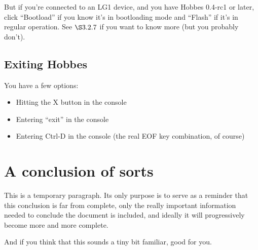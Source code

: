But if you're connected to an LG1 device, and you have Hobbes 0.4-rc1 or later, click ``Bootload'' if you know it's in bootloading mode and ``Flash'' if it's in regular operation. See \hyperref[3.2.7]{$\S3.2.7$} if you want to know more (but you probably don't).



%
%
\subsection{Exiting Hobbes}
\label{3.4}

You have a few options:
\begin{itemize}
\item Hitting the X button in the console
\item Entering ``exit'' in the console
\item Entering Ctrl-D in the console (the real EOF key combination, of course)
\end{itemize}



%
%
\section{A conclusion of sorts}
\label{4}

This is a temporary paragraph. Its only purpose is to serve as a reminder that this conclusion is far from complete, only the really important information needed to conclude the document is included, and ideally it will progressively become more and more complete.

And if you think that this sounds a tiny bit familiar, good for you.



